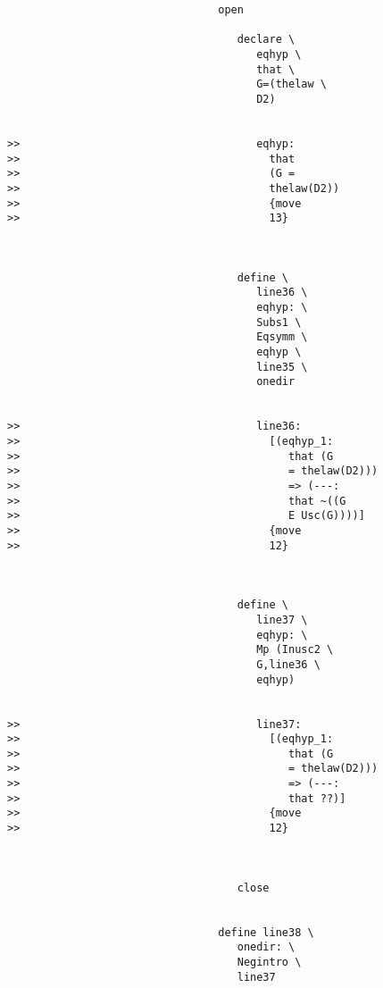 \documentclass[12pt]{article}
\begin{document}
\begin{verbatim}
                                 open

                                    declare \
                                       eqhyp \
                                       that \
                                       G=(thelaw \
                                       D2)


>>                                     eqhyp:
>>                                       that
>>                                       (G =
>>                                       thelaw(D2))
>>                                       {move
>>                                       13}



                                    define \
                                       line36 \
                                       eqhyp: \
                                       Subs1 \
                                       Eqsymm \
                                       eqhyp \
                                       line35 \
                                       onedir


>>                                     line36:
>>                                       [(eqhyp_1:
>>                                          that (G
>>                                          = thelaw(D2)))
>>                                          => (---:
>>                                          that ~((G
>>                                          E Usc(G))))]
>>                                       {move
>>                                       12}



                                    define \
                                       line37 \
                                       eqhyp: \
                                       Mp (Inusc2 \
                                       G,line36 \
                                       eqhyp)


>>                                     line37:
>>                                       [(eqhyp_1:
>>                                          that (G
>>                                          = thelaw(D2)))
>>                                          => (---:
>>                                          that ??)]
>>                                       {move
>>                                       12}



                                    close


                                 define line38 \
                                    onedir: \
                                    Negintro \
                                    line37



\end{verbatim}
\end{document}
